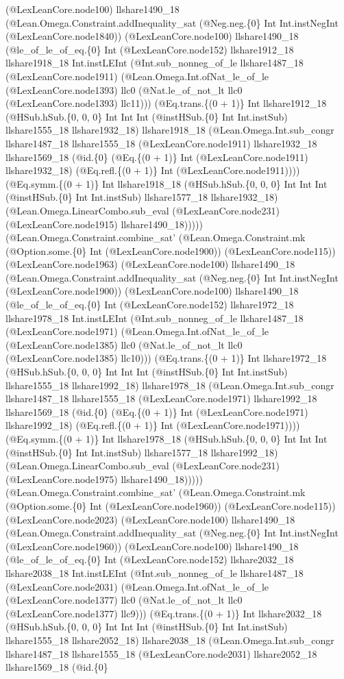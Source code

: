 \documentclass[11pt]{article}
\begin{document}
(@LexLeanCore.node100) llshare1490\_18 (@Lean.Omega.Constraint.addInequality\_sat (@Neg.neg.\{0\} Int Int.instNegInt (@LexLeanCore.node1840)) (@LexLeanCore.node100) llshare1490\_18 (@le\_of\_le\_of\_eq.\{0\} Int (@LexLeanCore.node152) llshare1912\_18 llshare1918\_18 Int.instLEInt (@Int.sub\_nonneg\_of\_le llshare1487\_18 (@LexLeanCore.node1911) (@Lean.Omega.Int.ofNat\_le\_of\_le (@LexLeanCore.node1393) llc0 (@Nat.le\_of\_not\_lt llc0 (@LexLeanCore.node1393) llc11))) (@Eq.trans.\{(0 + 1)\} Int llshare1912\_18 (@HSub.hSub.\{0, 0, 0\} Int Int Int (@instHSub.\{0\} Int Int.instSub) llshare1555\_18 llshare1932\_18) llshare1918\_18 (@Lean.Omega.Int.sub\_congr llshare1487\_18 llshare1555\_18 (@LexLeanCore.node1911) llshare1932\_18 llshare1569\_18 (@id.\{0\} (@Eq.\{(0 + 1)\} Int (@LexLeanCore.node1911) llshare1932\_18) (@Eq.refl.\{(0 + 1)\} Int (@LexLeanCore.node1911)))) (@Eq.symm.\{(0 + 1)\} Int llshare1918\_18 (@HSub.hSub.\{0, 0, 0\} Int Int Int (@instHSub.\{0\} Int Int.instSub) llshare1577\_18 llshare1932\_18) (@Lean.Omega.LinearCombo.sub\_eval (@LexLeanCore.node231) (@LexLeanCore.node1915) llshare1490\_18))))) (@Lean.Omega.Constraint.combine\_sat' (@Lean.Omega.Constraint.mk (@Option.some.\{0\} Int (@LexLeanCore.node1900)) (@LexLeanCore.node115)) (@LexLeanCore.node1963) (@LexLeanCore.node100) llshare1490\_18 (@Lean.Omega.Constraint.addInequality\_sat (@Neg.neg.\{0\} Int Int.instNegInt (@LexLeanCore.node1900)) (@LexLeanCore.node100) llshare1490\_18 (@le\_of\_le\_of\_eq.\{0\} Int (@LexLeanCore.node152) llshare1972\_18 llshare1978\_18 Int.instLEInt (@Int.sub\_nonneg\_of\_le llshare1487\_18 (@LexLeanCore.node1971) (@Lean.Omega.Int.ofNat\_le\_of\_le (@LexLeanCore.node1385) llc0 (@Nat.le\_of\_not\_lt llc0 (@LexLeanCore.node1385) llc10))) (@Eq.trans.\{(0 + 1)\} Int llshare1972\_18 (@HSub.hSub.\{0, 0, 0\} Int Int Int (@instHSub.\{0\} Int Int.instSub) llshare1555\_18 llshare1992\_18) llshare1978\_18 (@Lean.Omega.Int.sub\_congr llshare1487\_18 llshare1555\_18 (@LexLeanCore.node1971) llshare1992\_18 llshare1569\_18 (@id.\{0\} (@Eq.\{(0 + 1)\} Int (@LexLeanCore.node1971) llshare1992\_18) (@Eq.refl.\{(0 + 1)\} Int (@LexLeanCore.node1971)))) (@Eq.symm.\{(0 + 1)\} Int llshare1978\_18 (@HSub.hSub.\{0, 0, 0\} Int Int Int (@instHSub.\{0\} Int Int.instSub) llshare1577\_18 llshare1992\_18) (@Lean.Omega.LinearCombo.sub\_eval (@LexLeanCore.node231) (@LexLeanCore.node1975) llshare1490\_18))))) (@Lean.Omega.Constraint.combine\_sat' (@Lean.Omega.Constraint.mk (@Option.some.\{0\} Int (@LexLeanCore.node1960)) (@LexLeanCore.node115)) (@LexLeanCore.node2023) (@LexLeanCore.node100) llshare1490\_18 (@Lean.Omega.Constraint.addInequality\_sat (@Neg.neg.\{0\} Int Int.instNegInt (@LexLeanCore.node1960)) (@LexLeanCore.node100) llshare1490\_18 (@le\_of\_le\_of\_eq.\{0\} Int (@LexLeanCore.node152) llshare2032\_18 llshare2038\_18 Int.instLEInt (@Int.sub\_nonneg\_of\_le llshare1487\_18 (@LexLeanCore.node2031) (@Lean.Omega.Int.ofNat\_le\_of\_le (@LexLeanCore.node1377) llc0 (@Nat.le\_of\_not\_lt llc0 (@LexLeanCore.node1377) llc9))) (@Eq.trans.\{(0 + 1)\} Int llshare2032\_18 (@HSub.hSub.\{0, 0, 0\} Int Int Int (@instHSub.\{0\} Int Int.instSub) llshare1555\_18 llshare2052\_18) llshare2038\_18 (@Lean.Omega.Int.sub\_congr llshare1487\_18 llshare1555\_18 (@LexLeanCore.node2031) llshare2052\_18 llshare1569\_18 (@id.\{0\} 
\end{document}
